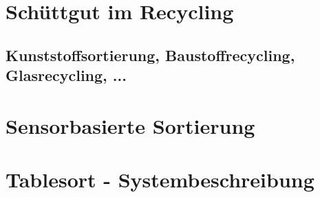
\todoin{}



\section{Schüttgut im Recycling}
\subsection{Kunststoffsortierung, Baustoffrecycling, Glasrecycling, ...}
\section{Sensorbasierte Sortierung}
\section{Tablesort - Systembeschreibung}


